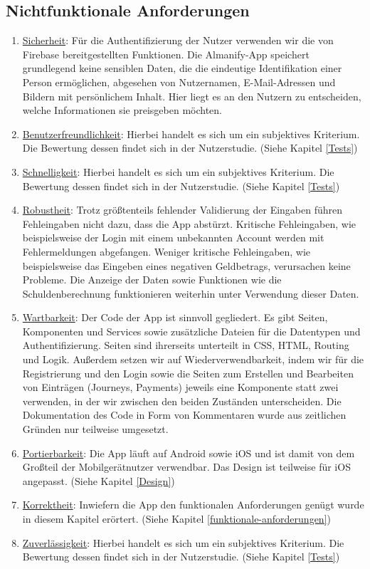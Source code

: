 \subsection{Nichtfunktionale Anforderungen}
\begin{enumerate}
	\item \underline{Sicherheit}: Für die Authentifizierung der Nutzer verwenden wir die von Firebase bereitgestellten Funktionen. Die Almanify-App speichert grundlegend keine sensiblen Daten, die die eindeutige Identifikation einer Person ermöglichen, abgesehen von Nutzernamen, E-Mail-Adressen und Bildern mit persönlichem Inhalt. Hier liegt es an den Nutzern zu entscheiden, welche Informationen sie preisgeben möchten. 
	\item \underline{Benutzerfreundlichkeit}: Hierbei handelt es sich um ein subjektives Kriterium. Die Bewertung dessen findet sich in der Nutzerstudie. (Siehe Kapitel \ref{Tests})
	\item \underline{Schnelligkeit}: Hierbei handelt es sich um ein subjektives Kriterium. Die Bewertung dessen findet sich in der Nutzerstudie. (Siehe Kapitel \ref{Tests})
	\item \underline{Robustheit}: Trotz größtenteils fehlender Validierung der Eingaben führen Fehleingaben nicht dazu, dass die App abstürzt. Kritische Fehleingaben, wie beispielsweise der Login mit einem unbekannten Account werden mit Fehlermeldungen abgefangen. Weniger kritische Fehleingaben, wie beispielsweise das Eingeben eines negativen Geldbetrags, verursachen keine Probleme. Die Anzeige der Daten sowie Funktionen wie die Schuldenberechnung funktionieren weiterhin unter Verwendung dieser Daten.
	\item \underline{Wartbarkeit}: Der Code der App ist sinnvoll gegliedert. Es gibt Seiten, Komponenten und Services sowie zusätzliche Dateien für die Datentypen und Authentifizierung. Seiten sind ihrerseits unterteilt in CSS, HTML, Routing und Logik.
	Außerdem setzen wir auf Wiederverwendbarkeit, indem wir für die Registrierung und den Login sowie die Seiten zum Erstellen und Bearbeiten von Einträgen (Journeys, Payments) jeweils eine Komponente statt zwei verwenden, in der wir zwischen den beiden Zuständen unterscheiden. Die Dokumentation des Code in Form von Kommentaren wurde aus zeitlichen Gründen nur teilweise umgesetzt.
	\item \underline{Portierbarkeit}: Die App läuft auf Android sowie iOS und ist damit von dem Großteil der Mobilgerätnutzer verwendbar. Das Design ist teilweise für iOS angepasst. (Siehe Kapitel \ref{Design})
	\item \underline{Korrektheit}: Inwiefern die App den funktionalen Anforderungen genügt wurde in diesem Kapitel erörtert. (Siehe Kapitel \ref{funktionale-anforderungen})
	\item \underline{Zuverlässigkeit}: Hierbei handelt es sich um ein subjektives Kriterium. Die Bewertung dessen findet sich in der Nutzerstudie. (Siehe Kapitel \ref{Tests})
				
\end{enumerate}






